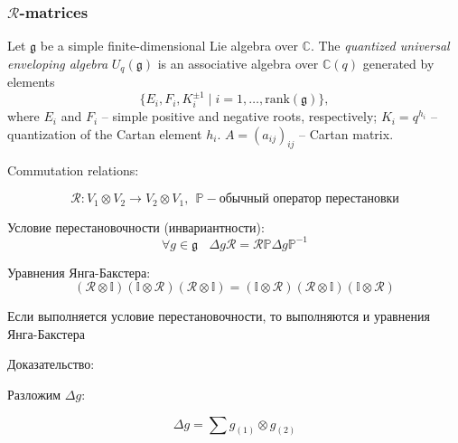 \documentclass[12pt,a4paper]{article}
\begin{document}
\subsubsection{$\mathcal{R}$-matrices}
\begin{tcolorbox}
\begin{definition}
    Let $\mathfrak{g}$ be a simple finite-dimensional Lie algebra over $\mathbb{C}$. 
The \emph{quantized universal enveloping algebra} $U_q(\mathfrak{g})$ is an associative algebra over $\mathbb{C}(q)$ generated by elements
\[
\{ E_i, F_i, K_i^{\pm 1} \mid i = 1, \dots, \mathrm{rank}(\mathfrak{g}) \},\] 
where $E_i$ and $F_i$ -- simple positive and negative roots, respectively; $K_i = q^{h_i}$ -- quantization of the Cartan element $h_i$. $A = (a_{ij})_{ij}$ -- Cartan matrix.

Commutation relations:




\end{definition}
\end{tcolorbox}



\begin{equation}
    \mathcal{R}:V_1 \otimes V_2 \rightarrow V_2 \otimes V_1, \ \ \mathbb{P} -
    \text{обычный оператор перестановки}
\end{equation}

Условие перестановочности (инвариантности):
\begin{equation}
    \forall g \in \mathfrak{g} \ \ \ \ \Delta g \mathcal{R} = \mathcal{R}
    \mathbb{P} \Delta g \mathbb{P}^{-1}
\end{equation}

Уравнения Янга-Бакстера:
\begin{equation}
    (\mathcal{R} \otimes \mathbb{I})(\mathbb{I} \otimes \mathcal{R})
    (\mathcal{R} \otimes \mathbb{I}) = (\mathbb{I} \otimes \mathcal{R})
    (\mathcal{R} \otimes \mathbb{I}) (\mathbb{I} \otimes \mathcal{R})
    \label{eq:YB}
\end{equation}

\begin{theorem}
    Если выполняется условие перестановочности, то выполняются и
    уравнения Янга-Бакстера
\end{theorem}

Доказательство:

Разложим $\Delta g$:

\begin{equation}
    \Delta g = \sum g_{(1)} \otimes g_{(2)} 
    \label{eq:gexp}
\end{equation}
\end{document}

